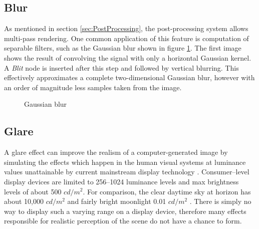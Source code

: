 \subsection{Blur}

As mentioned in section \ref{sec:PostProcessing}, the post-processing system allows multi-pass rendering. One common application of this feature is computation of separable filters, such as the Gaussian blur shown in figure \ref{fig:postProcBlur}. The first image shows the result of convolving the signal with only a horizontal Gaussian kernel. A \emph{Blit} node is inserted after this step and followed by vertical blurring. This effectively approximates a complete two-dimensional Gaussian blur, however with an order of magnitude less samples taken from the image.

\begin{figure}[h!]
  \centering
  \caption{Gaussian blur}
  \label{fig:postProcBlur}
\end{figure}

\subsection{Glare}

A glare effect can improve the realism of a computer-generated image by simulating the effects which happen in the human visual systems at luminance values unattainable by current mainstream display technology \cite{Spencer95physicallybasedglare}. Consumer--level display devices are limited to 256--1024 luminance levels and max brightness levels of about 500 $cd/m^2$. For comparison, the clear daytime sky at horizon has about 10,000 $cd/m^2$ and fairly bright moonlight 0.01 $cd/m^2$ \cite{radiometryPhotometry}. There is simply no way to display such a varying range on a display device, therefore many effects responsible for realistic perception of the scene do not have a chance to form.

